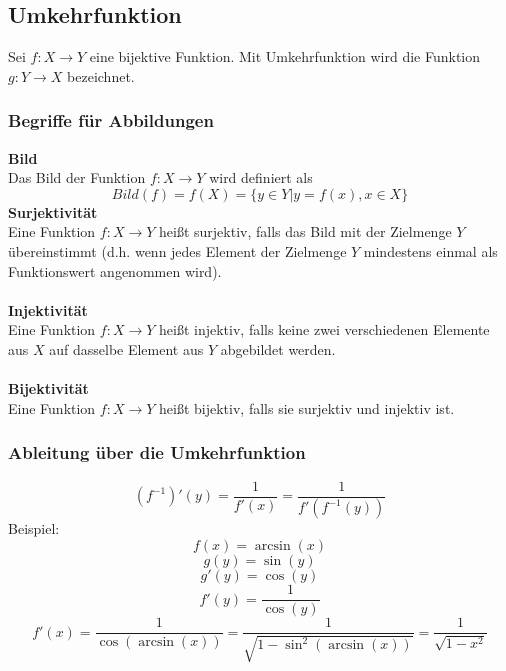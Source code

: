 \documentclass[a4paper,twocolumn,10pt]{article}
\begin{document}
\subsection{Umkehrfunktion}
Sei $f:X\rightarrow Y$ eine bijektive Funktion. Mit Umkehrfunktion wird die Funktion $g:Y\rightarrow X$ bezeichnet.

\subsubsection{Begriffe für Abbildungen}
\textbf{Bild}\\
Das Bild der Funktion $f:X\rightarrow Y$ wird definiert als
\begin{equation*}
Bild(f)=f(X)=\{y\in Y|y=f(x),x\in X\}
\end{equation*}
\textbf{Surjektivität}\\
Eine Funktion $f:X\rightarrow Y$ heißt surjektiv, falls das Bild mit der Zielmenge $Y$ übereinstimmt (d.h. wenn jedes Element der Zielmenge $Y$ mindestens einmal als Funktionswert angenommen wird).\\\\
\textbf{Injektivität}\\
Eine Funktion $f:X\rightarrow Y$ heißt injektiv, falls keine zwei verschiedenen Elemente aus $X$ auf dasselbe Element aus $Y$ abgebildet werden.\\\\
\textbf{Bijektivität}\\
Eine Funktion $f:X\rightarrow Y$ heißt bijektiv, falls sie surjektiv und injektiv ist.

\subsubsection{Ableitung über die Umkehrfunktion}
\begin{equation*}
(f^{-1})'(y)=\frac{1}{f'(x)}=\frac{1}{f'(f^{-1}(y))}
\end{equation*}
Beispiel:
\begin{equation*}
f(x)=\arcsin(x)
\end{equation*}
\begin{equation*}
g(y)=\sin(y)
\end{equation*}
\begin{equation*}
g'(y)=\cos(y)
\end{equation*}
\begin{equation*}
f'(y)=\frac{1}{\cos(y)}
\end{equation*}
\begin{equation*}
f'(x)=\frac{1}{\cos(\arcsin(x))}=\frac{1}{\sqrt{1-\sin^2(\arcsin(x))}}=\frac{1}{\sqrt{1-x^2}}
\end{equation*}
\end{document}
